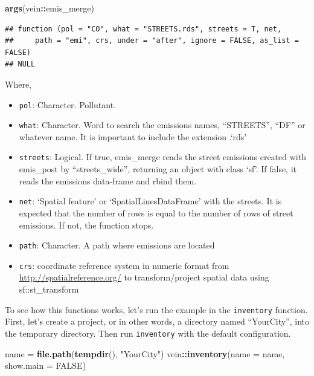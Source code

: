 \documentclass[12pt,graybox,envcountchap,sectrefs]{krantz}
\makeatletter
\newenvironment{Shaded}{\begin{snugshade}}{\end{snugshade}}
\newcommand{\KeywordTok}[1]{\textcolor[rgb]{0.13,0.29,0.53}{\textbf{#1}}}
\newcommand{\DataTypeTok}[1]{\textcolor[rgb]{0.13,0.29,0.53}{#1}}
\newcommand{\StringTok}[1]{\textcolor[rgb]{0.31,0.60,0.02}{#1}}
\newcommand{\OtherTok}[1]{\textcolor[rgb]{0.56,0.35,0.01}{#1}}
\newcommand{\OperatorTok}[1]{\textcolor[rgb]{0.81,0.36,0.00}{\textbf{#1}}}
\newcommand{\NormalTok}[1]{#1}
\providecommand{\tightlist}{%
  \setlength{\itemsep}{0pt}\setlength{\parskip}{0pt}}
\newenvironment{kframe}{%
\medskip{}
\setlength{\fboxsep}{.8em}
 \def\at@end@of@kframe{}%
 \ifinner\ifhmode%
  \def\at@end@of@kframe{\end{minipage}}%
  \begin{minipage}{\columnwidth}%
 \fi\fi%
 \def\FrameCommand##1{\hskip\@totalleftmargin \hskip-\fboxsep
 \colorbox{shadecolor}{##1}\hskip-\fboxsep
     \hskip-\linewidth \hskip-\@totalleftmargin \hskip\columnwidth}%
 \MakeFramed {\advance\hsize-\width
   \@totalleftmargin\z@ \linewidth\hsize
   \@setminipage}}%
 {\par\unskip\endMakeFramed%
 \at@end@of@kframe}
\renewenvironment{Shaded}{\begin{kframe}}{\end{kframe}}
\theoremstyle{definition}
\theoremstyle{definition}
\theoremstyle{definition}
\theoremstyle{remark}
\makeatother
\begin{document}
\begin{Shaded}
\begin{Highlighting}[]
\KeywordTok{args}\NormalTok{(vein}\OperatorTok{::}\NormalTok{emis_merge)}
\end{Highlighting}
\end{Shaded}

\begin{verbatim}
## function (pol = "CO", what = "STREETS.rds", streets = T, net, 
##     path = "emi", crs, under = "after", ignore = FALSE, as_list = FALSE) 
## NULL
\end{verbatim}

Where,

\begin{itemize}
\tightlist
\item
  \texttt{pol}: Character. Pollutant.
\item
  \texttt{what}: Character. Word to search the emissions names,
  ``STREETS'', ``DF'' or whatever name. It is important to include the
  extension .`rds'
\item
  \texttt{streets}: Logical. If true, emis\_merge reads the street
  emissions created with emis\_post by ``streets\_wide'', returning an
  object with class `sf'. If false, it reads the emissions data-frame
  and rbind them.
\item
  \texttt{net}: `Spatial feature' or `SpatialLinesDataFrame' with the
  streets. It is expected that the number of rows is equal to the number
  of rows of street emissions. If not, the function stops.
\item
  \texttt{path}: Character. A path where emissions are located
\item
  \texttt{crs}: coordinate reference system in numeric format from
  \url{http://spatialreference.org/} to transform/project spatial data
  using sf::st\_transform
\end{itemize}

To see how this functions works, let's run the example in the
\texttt{inventory} function. First, let's create a project, or in other
words, a directory named ``YourCity'', into the temporary directory.
Then run \texttt{inventory} with the default configuration.

\begin{Shaded}
\begin{Highlighting}[]
\NormalTok{name =}\StringTok{ }\KeywordTok{file.path}\NormalTok{(}\KeywordTok{tempdir}\NormalTok{(), }\StringTok{"YourCity"}\NormalTok{)}
\NormalTok{vein}\OperatorTok{::}\KeywordTok{inventory}\NormalTok{(}\DataTypeTok{name =}\NormalTok{ name, }\DataTypeTok{show.main =} \OtherTok{FALSE}\NormalTok{)}
\end{Highlighting}
\end{Shaded}
\end{document}

